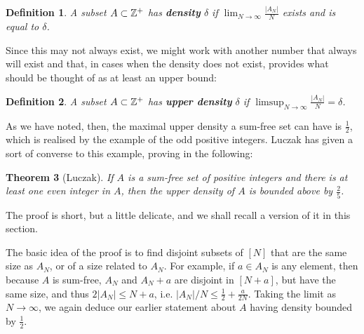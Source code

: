 \documentclass{report}
\newtheorem{theorem}{Theorem}[section]
\newtheorem{definition}[theorem]{Definition}
\theoremstyle{remark}
\numberwithin{equation}{section}
\begin{document}
\begin{definition}
  A subset $A \subset \mathbb{Z}^+$ has \textbf{density} $\delta$ if
  $\lim_{N \to \infty} \frac{|A_N|}{N}$ exists and is equal to
  $\delta$.
\end{definition}

Since this may not always exist, we might work with another number
that always will exist and that, in cases when the density does not
exist, provides what should be thought of as at least an upper bound: 

\begin{definition}
  A subset $A \subset \mathbb{Z}^+$ has \textbf{upper density} $\delta$ if
  $\limsup_{N \to \infty}\frac{|A_N|}{N} = \delta$.
\end{definition}

As we have noted, then, the maximal upper density a sum-free set can
have is $\frac12$, which is realised by the example of the odd
positive integers.  Luczak has given a sort of converse to this
example, proving in \cite{luczak:jct1995} the following: 

\begin{theorem}[Luczak]
If $A$ is a sum-free set of positive integers and there is at least
one even integer in $A$, then the upper density of $A$ is bounded
above by $\frac25$.  
\end{theorem}  

The proof is short, but a
little delicate, and we shall recall a version of it in this section.

The basic idea of the proof is to find disjoint subsets of $[N]$ that
are the same size as $A_N$, or of a size related to $A_N$.  For
example, if $a \in A_N$ is any element, then because $A$ is sum-free,
$A_N$ and $A_N+a$ are disjoint in $[N+a]$, but have the same size, and
thus $2|A_N| \leq N+a$, i.e. $|A_N|/N \leq \frac12 + \frac{a}{2N}$.
Taking the limit as $N \to \infty$, we again deduce our earlier
statement about $A$ having density bounded by $\frac12$.
\end{document}
